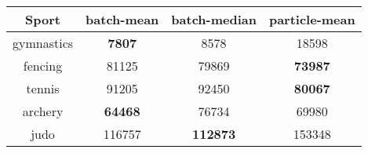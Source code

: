\begin{tabular}{|c|c|c|c|}
\hline
Sport & batch-mean & batch-median & particle-mean \\
\hline
gymnastics & \textbf{7807} & 8578 & 18598 \\
fencing & 81125 & 79869 & \textbf{73987} \\
tennis & 91205 & 92450 & \textbf{80067} \\
archery & \textbf{64468} & 76734 & 69980 \\
judo & 116757 & \textbf{112873} & 153348 \\
\hline
\end{tabular}
